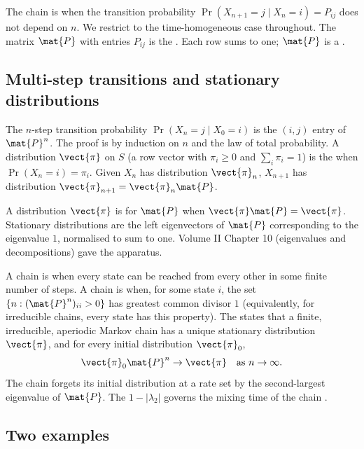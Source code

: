 The chain is  when the transition
probability $\Pr(X_{n+1} = j \mid X_{n} = i) = P_{ij}$ does not
depend on $n$. We restrict to the time-homogeneous case throughout.
The matrix $\mat{P}$ with entries $P_{ij}$ is the
. Each row sums to one; $\mat{P}$ is a
.

\subsection{Multi-step transitions and stationary distributions}

The $n$-step transition probability $\Pr(X_{n} = j \mid X_{0} = i)$
is the $(i, j)$ entry of $\mat{P}^{n}$. The proof is by induction
on $n$ and the law of total probability. A distribution
$\vect{\pi}$ on $S$ (a row vector with $\pi_{i} \geq 0$ and
$\sum_{i} \pi_{i} = 1$) is the 
when $\Pr(X_{n} = i) = \pi_{i}$. Given $X_{n}$ has distribution
$\vect{\pi}_{n}$, $X_{n+1}$ has distribution $\vect{\pi}_{n+1} =
\vect{\pi}_{n} \mat{P}$.

A distribution $\vect{\pi}$ is  for $\mat{P}$
when $\vect{\pi} \mat{P} = \vect{\pi}$. Stationary distributions are
the left eigenvectors of $\mat{P}$ corresponding to the eigenvalue
$1$, normalised to sum to one. Volume II Chapter 10 (eigenvalues
and decompositions) gave the apparatus.

A chain is  when every state can be reached
from every other in some finite number of steps. A chain is
 when, for some state $i$, the set
$\{n : (\mat{P}^{n})_{ii} > 0\}$ has greatest common divisor $1$
(equivalently, for irreducible chains, every state has this
property). The 
states that a finite, irreducible, aperiodic Markov chain has a
unique stationary distribution $\vect{\pi}$, and for every initial
distribution $\vect{\pi}_{0}$,
\[
\vect{\pi}_{0} \mat{P}^{n} \to \vect{\pi} \quad\text{as }
n \to \infty.
\]
The chain forgets its initial distribution at a rate set by the
second-largest eigenvalue of $\mat{P}$. The 
$1 - |\lambda_{2}|$ governs the mixing time of the chain
\cite[ch.~6]{text:wasserman2004}.

\subsection{Two examples}

